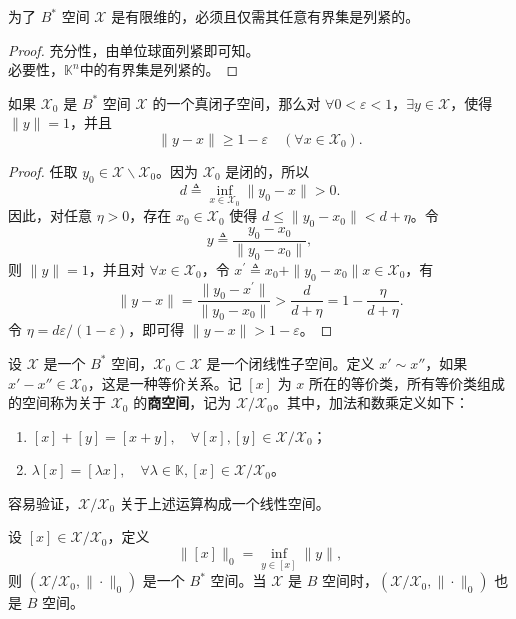 \documentclass[lang=cn,newtx,10pt,scheme=chinese,thmcnt=chapter]{elegantbook}
\begin{document}
\begin{corollary}
为了 ${B}^*$ 空间 $\mathscr{X}$ 是有限维的，必须且仅需其任意有界集是列紧的。
\end{corollary}
\begin{proof}
    充分性，由单位球面列紧即可知。\\
    必要性，$\mathbb{K}^n$中的有界集是列紧的。
\end{proof}

\begin{lemma}[Riesz 引理]
如果 $\mathscr{X}_0$ 是 ${B}^*$ 空间 $\mathscr{X}$ 的一个真闭子空间，那么对 $\forall 0 < \varepsilon < 1$，$\exists y \in \mathscr{X}$，使得 $\|y\| = 1$，并且
\[
\|y - x\| \geqslant 1 - \varepsilon \quad (\forall x \in \mathscr{X}_0).
\]
\end{lemma}

\begin{proof}
任取 $y_0 \in \mathscr{X} \backslash \mathscr{X}_0$。因为 $\mathscr{X}_0$ 是闭的，所以
\[
d \triangleq \inf_{x \in \mathscr{X}_0} \|y_0 - x\| > 0.
\]
因此，对任意 $\eta > 0$，存在 $x_0 \in \mathscr{X}_0$ 使得 $d \leqslant \|y_0 - x_0\| < d + \eta$。令
\[
y \triangleq \frac{y_0 - x_0}{\|y_0 - x_0\|},
\]
则 $\|y\| = 1$，并且对 $\forall x \in \mathscr{X}_0$，令 $x^{\prime} \triangleq x_0 + \|y_0 - x_0\|x \in \mathscr{X}_0$，有
\[
\|y - x\| = \frac{\|y_0 - x^{\prime}\|}{\|y_0 - x_0\|} > \frac{d}{d + \eta} = 1 - \frac{\eta}{d + \eta}.
\]
令 $\eta = d\varepsilon / (1 - \varepsilon)$，即可得 $\|y - x\| > 1 - \varepsilon$。
\end{proof}
\begin{definition}
设 $\mathscr{X}$ 是一个 $B^*$ 空间，$\mathscr{X}_0 \subset \mathscr{X}$ 是一个闭线性子空间。定义 $x' \sim x''$，如果 $x' - x'' \in \mathscr{X}_0$，这是一种等价关系。记 $[x]$ 为 $x$ 所在的等价类，所有等价类组成的空间称为关于 $\mathscr{X}_0$ 的\textbf{商空间}，记为 $\mathscr{X} / \mathscr{X}_0$。其中，加法和数乘定义如下：
\begin{enumerate}
    \item $[x] + [y] = [x + y], \quad \forall [x], [y] \in \mathscr{X} / \mathscr{X}_0$；
    \item $\lambda [x] = [\lambda x], \quad \forall \lambda \in \mathbb{K}, [x] \in \mathscr{X} / \mathscr{X}_0$。
\end{enumerate}
\end{definition}

\begin{note}容易验证，$\mathscr{X} / \mathscr{X}_0$ 关于上述运算构成一个线性空间。
\end{note}
\begin{theorem}
设 $[x] \in \mathscr{X} / \mathscr{X}_0$，定义
\[
\|[x]\|_0 = \inf_{y \in [x]} \|y\|,
\]
则 $\left(\mathscr{X} / \mathscr{X}_0, \|\cdot\|_0\right)$ 是一个 $B^*$ 空间。当 $\mathscr{X}$ 是 $B$ 空间时，$\left(\mathscr{X} / \mathscr{X}_0, \|\cdot\|_0\right)$ 也是 $B$ 空间。
\end{theorem}
\end{document}
